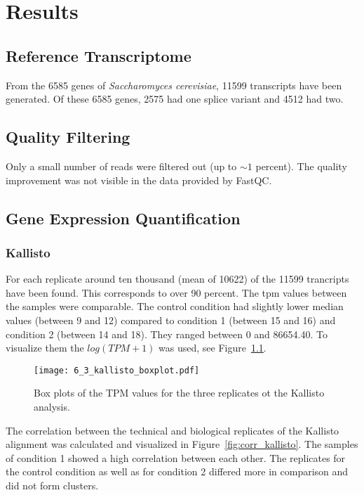 \chapter{Results}

\section{Reference Transcriptome}

From the 6585 genes of \textit{Saccharomyces cerevisiae}, 11599 transcripts have been generated. 
Of these 6585 genes, 2575 had one splice variant and 4512 had two.

\section{Quality Filtering}

Only a small number of reads were filtered out (up to $\sim 1$ percent).
The quality improvement was not visible in the data provided by 
FastQC.

\section{Gene Expression Quantification}
\subsection{Kallisto}
For each replicate around ten thousand (mean of 10622) of the 11599 trancripts have 
been found. This corresponds to over 90 percent. The \gls{tpm} values between the samples were comparable. 
The control condition had slightly lower median values (between 9 and 12) compared to 
condition 1 (between 15 and 16) and condition 2 (between 14 and 18). 
They ranged between 0 and 86654.40. To visualize them the $log(TPM+1)$ was used, see
Figure~\ref{fig:box_kallisto}.

\begin{figure}[H]
  \center
  \texttt{[image: 6\_3\_kallisto\_boxplot.pdf]}
  \caption{Box plots of the TPM values for the three replicates ot the Kallisto analysis.}\label{fig:box_kallisto}
\end{figure}

The correlation between the technical and biological replicates of the Kallisto 
alignment was calculated and visualized in 
Figure~\ref{fig:corr_kallisto}.
The samples of condition 1 showed a high correlation between each other. The replicates for 
the control condition as well as for condition 2 differed more in comparison and did not 
form clusters. 

